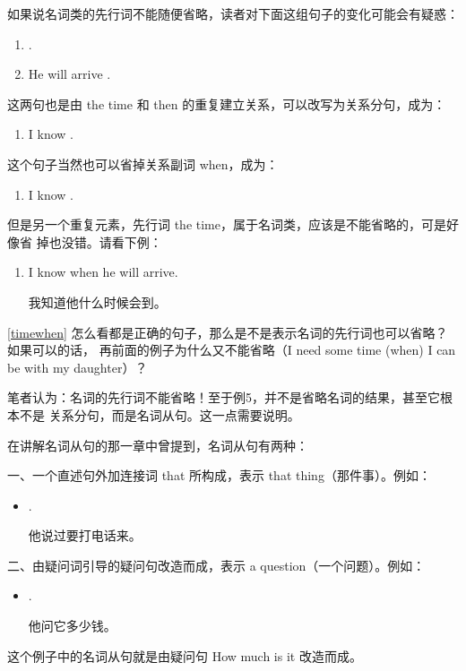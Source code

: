 如果说名词类的先行词不能随便省略，读者对下面这组句子的变化可能会有疑惑：
\begin{enumerate}
\item {}  .
\item He will arrive .
\end{enumerate}
这两句也是由 the time 和 then 的重复建立关系，可以改写为关系分句，成为：
\begin{enumerate}[resume]
\item I know  .
\end{enumerate}
这个句子当然也可以省掉关系副词 when，成为：
\begin{enumerate}[resume]
\item I know  .
\end{enumerate}
但是另一个重复元素，先行词 the time，属于名词类，应该是不能省略的，可是好像省
掉也没错。请看下例：
\begin{enumerate}[resume]
\item\label{timewhen} I know when he will arrive.

  我知道他什么时候会到。
\end{enumerate}

\ref{timewhen} 怎么看都是正确的句子，那么是不是表示名词的先行词也可以省略？如果可以的话，
再前面的例子为什么又不能省略（I need some time (when) I can be with my
daughter）？

笔者认为：名词的先行词不能省略！至于例5，并不是省略名词的结果，甚至它根本不是
关系分句，而是名词从句。这一点需要说明。

在讲解名词从句的那一章中曾提到，名词从句有两种：

一、一个直述句外加连接词 that 所构成，表示 that thing（那件事）。例如：
\begin{itemize}
\item {}  .

  他说过要打电话来。
\end{itemize}

二、由疑问词引导的疑问句改造而成，表示 a question（一个问题）。例如：
\begin{itemize}
\item {}  .

  他问它多少钱。
\end{itemize}
这个例子中的名词从句就是由疑问句 How much is it 改造而成。

